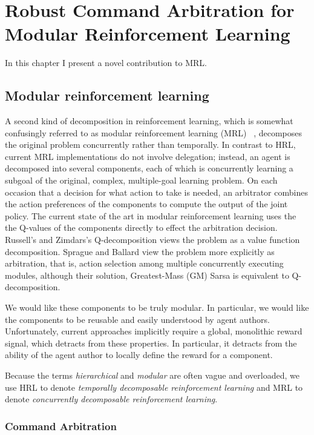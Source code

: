\chapter{Robust Command Arbitration for Modular Reinforcement Learning}

In this chapter I present a novel contribution to MRL.

\section{Modular reinforcement learning}

A second kind of decomposition in reinforcement learning, which is somewhat confusingly referred to as modular reinforcement learning (MRL) ~\cite{russell2003q-decomposition,sprague2003multiple-goal}, decomposes the original problem concurrently rather than temporally. In contrast to HRL, current MRL implementations do not involve delegation; instead, an agent is decomposed into several components, each of which is concurrently learning a subgoal of the original, complex, multiple-goal learning problem. On each occasion that a decision for what action to take is needed, an arbitrator combines the action preferences of the components to compute the output of the joint policy.  The current state of the art in modular reinforcement learning uses the the Q-values of the components directly to effect the arbitration decision.  Russell's and Zimdars's Q-decomposition \cite{russell2003q-decomposition} views the problem as a value function decomposition.  Sprague and Ballard view the problem more explicitly as arbitration, that is, action selection among multiple concurrently executing modules, although their solution, Greatest-Mass (GM) Sarsa \cite{sprague2003multiple-goal} is equivalent to Q-decomposition.

We would like these components to be truly modular. In particular, we would like the components to be reusable and easily understood by agent authors.  Unfortunately, current approaches implicitly require a global, monolithic reward signal, which detracts from these properties.  In particular, it detracts from the ability of the agent author to locally define the reward for a component.

Because the terms {\em hierarchical} and {\em modular} are often vague and overloaded, we use HRL to denote {\em temporally decomposable
  reinforcement learning} and MRL to denote {\em concurrently
  decomposable reinforcement learning}.

\subsection{Command Arbitration}

